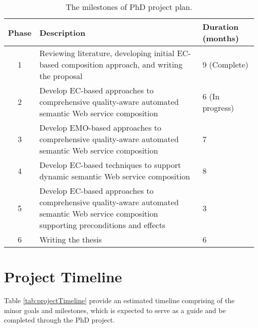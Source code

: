 \begin{table}
\small
\centering
\caption{The milestones of PhD project plan.}
\vspace{0.2cm}
\begin{tabular}{|c|p{100mm}|l|}
\hline
Phase & Description & Duration (months) \\ \hline
1 & Reviewing literature, developing initial EC-based composition approach, and writing the proposal & 9 (Complete)  \\
2 & Develop EC-based approaches to comprehensive quality-aware automated semantic Web service composition & 6 (In progress) \\
3 & Develop EMO-based approaches to comprehensive quality-aware automated semantic Web service composition & 7 \\
4 & Develop EC-based techniques to support dynamic semantic Web service composition & 8 \\
5 & Develop EC-based approaches to comprehensive quality-aware automated semantic Web service composition supporting preconditions and effects & 3 \\
6 & Writing the thesis & 6 \\ \hline
\end{tabular}
\label{tab:projectOverview}
\end{table}

\section{Project Timeline}

Table \ref{tab:projectTimeline} provide an estimated timeline comprising of the minor goals and milestones, which is expected to serve as a guide and be completed through the PhD project.

